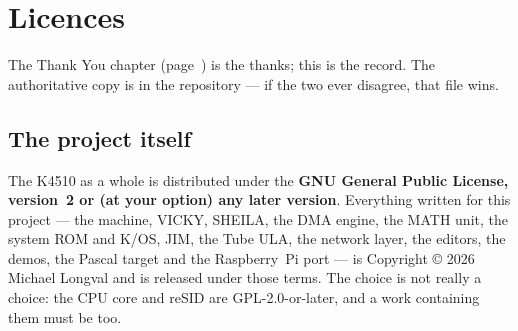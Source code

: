 \chapter{Licences}\label{cha:licences}

The Thank You chapter (page~\pageref{cha:thanks}) is the thanks; this
is the record. The
authoritative copy is  in the repository --- if the
two ever disagree, that file wins.

\section{The project itself}
The K4510 as a whole is distributed under the \textbf{GNU General
Public License, version~2 or (at your option) any later version}.
Everything written for this project --- the machine, VICKY, SHEILA,
the DMA engine, the MATH unit, the system ROM and K/OS, JIM, the Tube
ULA, the network layer, the editors, the demos, the Pascal target and
the Raspberry~Pi port --- is Copyright \copyright{} 2026 Michael
Longval and is released under those terms. The choice is not really a
choice: the CPU core and reSID are GPL-2.0-or-later, and a work
containing them must be too.

